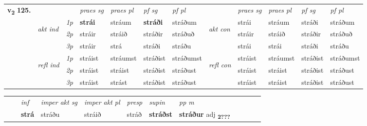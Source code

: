 \begin{tabular}{llllllllllll} \toprule
\multirow{4}{*}{{{\textbf{v{\textsubscript{2}}} \Large{\textbf{125.}}}}}  & &   &  \textit{praes sg}  & \textit{praes pl}  &\textit{ pf sg} & \textit{pf pl} &  &  \textit{praes sg}  & \textit{praes pl}  & \textit{pf sg} & \textit{pf pl } \\*
	\cmidrule{4-7} \cmidrule{9-12}
 & \multirow{3}{*}{\begin{turn}{90}\textit{akt ind}\end{turn}} & {\textit{1p}} & \textbf{strái} & stráum    & \textbf{stráði} & stráðum & \multirow{3}{*}{\begin{turn}{90}\textit{akt con}\end{turn}} &strái & stráum & stráði & stráðum\\*
& &  {\textit{2p}} &  stráir  & stráið   & stráðir & stráðuð & & stráir & stráið & stráðir & stráðuð \\*
& &  {\textit{3p}} & stráir & strá   & stráði & stráðu & & strái & strái& stráði & stráðu  \\*
\cmidrule{4-7} \cmidrule{9-12}
 &\multirow{3}{*}{\begin{turn}{90}\textit{refl ind}\end{turn}} & {\textit{1p}} & stráist & stráumst    & stráðist & stráðumst & \multirow{3}{*}{\begin{turn}{90}\textit{refl con}\end{turn}}  &stráist & stráumst & stráðist & stráðumst\\*
 &&  {\textit{2p}} &  stráist  & stráist   & stráðist & stráðust & &stráist & stráist & stráðist & stráðust \\*
& &  {\textit{3p}} & stráist & strást   & stráðist & stráðust & & stráist & stráist& stráðist & stráðust  \\*
\cmidrule{4-7} \cmidrule{9-12}
\end{tabular}


\begin{tabular}{llllllllllll}
 & & \textit{inf} & \textit{imper akt sg} & \textit{imper akt pl}   & \textit{presp} & \textit{supin}  & \textit{pp m}     \\*
  & & \textbf{strá} & stráðu  & stráið   & stráð &  \textbf{stráðst}  & \textbf{stráður} adj \textbf{\textsubscript{2???}} \\*
\cmidrule{1-12}
\end{tabular}



